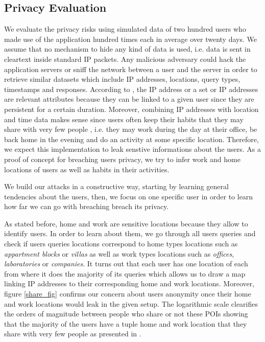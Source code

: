 \documentclass[10pt,conference,compsocconf]{IEEEtran}
\begin{document}
\subsection{Privacy Evaluation}
We evaluate the privacy risks using simulated data of two hundred users who made use of the application hundred times each in average over twenty days. We assume that no mechanism to hide any kind of data is used, i.e. data is sent in cleartext inside standard IP packets. Any malicious adversary could hack the application servers or sniff the network between a user and the server in order to retrieve similar datasets which include IP addresses, locations, query types, timestamps and responses. According to \cite{dont}, the IP address or a set or IP addresses are relevant attributes because they can be linked to a given user since they are persistent for a certain duration. Moreover, combining IP addresses with location and time data makes sense since users often keep their habits that they may share with very few people \cite{on}, i.e. they may work during the day at their office, be back home in the evening and do an activity at some specific location. Therefore, we expect this implementation to leak senstive informations about the users. As a proof of concept for breaching users privacy, we try to infer work and home locations of users as well as habits in their activities.

We build our attacks in a constructive way, starting by learning general tendencies about the users, then, we focus on one specific user in order to learn how far we can go with breaching breach its privacy.

As stated before, home and work are sensitive locations because they allow to identify users. In order to learn about them, we go through all users queries and check if users queries locations correspond to home types locations such as \textit{appartment blocks} or \textit{villas} as well as work types locations such as \textit{offices}, \textit{laboratories} or \textit{companies}. It turns out that each user has one location of each from where it does the majority of its queries which allows us to draw a map linking IP addresses to their corresponding home and work locations. Moreover, figure \ref{share_fig} confirms our concern about users anonymity once their home and work locations would leak in the given setup. The logarithmic scale clearifies the orders of magnitude between people who share or not these POIs showing that the majority of the users have a tuple home and work location that they share with very few people as presented in \cite{on}.
\end{document}
